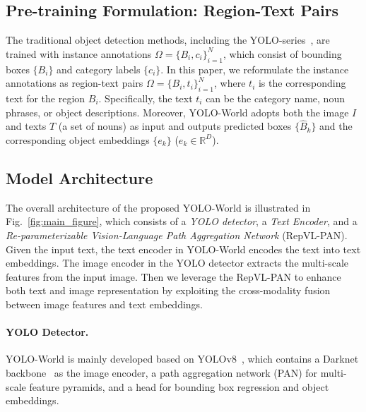 \documentclass[10pt,twocolumn,letterpaper]{article}
\newcommand{\name}{YOLO-World}
\begin{document}
\subsection{Pre-training Formulation: Region-Text Pairs}
The traditional object detection methods, including the YOLO-series~\cite{yolov8_ultralytics}, are trained with instance annotations $\Omega=\{B_i, c_i\}_{i=1}^N$, which consist of bounding boxes $\{B_i\}$ and category labels $\{c_i\}$.
In this paper, we reformulate the instance annotations as region-text pairs $\Omega=\{B_i, t_i\}_{i=1}^N$, where $t_i$ is the corresponding text for the region $B_i$.
Specifically, the text $t_i$ can be the category name, noun phrases, or object descriptions.
Moreover, \name{} adopts both the image $I$ and texts $T$ (a set of nouns) as input and outputs predicted boxes $\{\hat{B}_k\}$ and the corresponding object embeddings $\{e_k\}$ ($e_k \in \mathbb{R}^D$).

\subsection{Model Architecture}
The overall architecture of the proposed \name{} is illustrated in Fig.~\ref{fig:main_figure}, which consists of a \textit{YOLO detector}, a \textit{Text Encoder}, and a \textit{Re-parameterizable Vision-Language Path Aggregation Network} (RepVL-PAN).
Given the input text, the text encoder in \name{} encodes the text into text embeddings.
The image encoder in the YOLO detector extracts the multi-scale features from the input image.
Then we leverage the RepVL-PAN to enhance both text and image representation by exploiting the cross-modality fusion between image features and text embeddings.

\paragraph{YOLO Detector.}
\name{} is mainly developed based on YOLOv8~\cite{yolov8_ultralytics}, which contains a Darknet backbone~\cite{YOLOv1, yolov8_ultralytics} as the image encoder, a path aggregation network (PAN) for multi-scale feature pyramids, and a head for bounding box regression and object embeddings.

\end{document}
